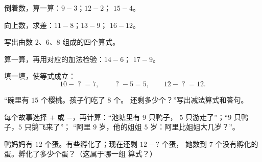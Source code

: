 \begin{exercise}[$\star$]\label{exo:g1:subtraction:2}
倒着数，算一算：$9 - 3$；\quad $12 - 2$；\quad
$15 - 4$。
\end{exercise}

\begin{exercise}[$\star$]\label{exo:g1:subtraction:3}
向上数，求差：$11 - 8$；\quad $13 - 9$；\quad
$16 - 12$。
\end{exercise}

\begin{exercise}[$\star$]\label{exo:g1:subtraction:4}
写出由数 $2$、$6$、$8$ 组成的四个算式。
\end{exercise}

\begin{exercise}[$\star$]\label{exo:g1:subtraction:5}
算一算，再用对应的加法检验：$14 - 6$；\quad
$17 - 9$。
\end{exercise}

\begin{exercise}[$\star$]\label{exo:g1:subtraction:6}
填一填，使等式成立：
\[
10 - \;?\; = 7, \qquad
\;?\; - 5 = 5, \qquad
12 - \;?\; = 12 .
\]
\end{exercise}

\begin{exercise}[$\star$]\label{exo:g1:subtraction:7}
“碗里有 $15$ 个樱桃。孩子们吃了 $8$ 个。
还剩多少个？”写出减法算式和答句。
\end{exercise}

\begin{exercise}[$\star$]\label{exo:g1:subtraction:8}
每个故事选择 $+$ 或 $-$，再计算：“池塘里有 $9$ 只鸭子，
$5$ 只游走了”；“$9$ 只鸭子，$5$ 只鹅飞来了”；
“阿里 $9$ 岁，他的姐姐 $5$ 岁：阿里比姐姐大几岁？”。
\end{exercise}

\begin{exercise}[$\star\star$]\label{exo:g1:subtraction:9}
鸭妈妈有 $12$ 个蛋。有些孵化了；现在还剩 $12 - ?$ 个蛋，
她数到 $7$ 个没有孵化的蛋。孵化了多少个蛋？（这属于哪一组
算式？）
\end{exercise}
